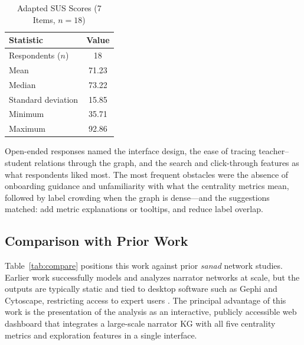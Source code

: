 \documentclass[conference]{IEEEtran}
\begin{document}
\begin{table}[!t]
\caption{Adapted SUS Scores (7 Items, $n=18$)}
\label{tab:sus}
\centering
\renewcommand{\arraystretch}{1.3}
\begin{tabular}{lc}
\toprule
Statistic & Value \\
\midrule
Respondents ($n$) & 18 \\
Mean              & 71.23 \\
Median            & 73.22 \\
Standard deviation & 15.85 \\
Minimum           & 35.71 \\
Maximum           & 92.86 \\
\bottomrule
\end{tabular}
\end{table}

Open-ended responses named the interface design, the ease of tracing
teacher--student relations through the graph, and the search and click-through
features as what respondents liked most. The most frequent obstacles were the
absence of onboarding guidance and unfamiliarity with what the centrality metrics
mean, followed by label crowding when the graph is dense---and the suggestions
matched: add metric explanations or tooltips, and reduce label overlap.

\subsection{Comparison with Prior Work}
\label{sec:compare}

Table~\ref{tab:compare} positions this work against prior \textit{sanad} network
studies. Earlier work successfully models and analyzes narrator networks at
scale, but the outputs are typically static and tied to desktop software such as
Gephi and Cytoscape, restricting access to expert users
\cite{FAROOQI2024110439,Shuaib2022}. The principal advantage of this work is the
presentation of the analysis as an interactive, publicly accessible web dashboard
that integrates a large-scale narrator KG with all five centrality metrics and
exploration features in a single interface.
\end{document}

